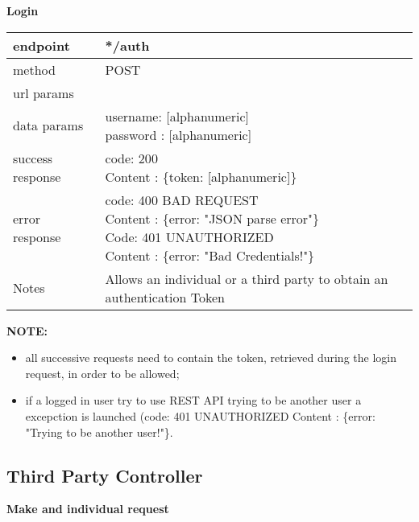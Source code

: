\textbf{Login}\\

	\begin{tabularx}{\linewidth}{| l| l }
		\hline
		endpoint & */auth\\
		\hline
		method & POST \\
		\hline
		url params & \\
		\hline
		data params &
		\parbox{0.7\textwidth}{
			\bigskip
			username: [alphanumeric]\\
			password : [alphanumeric]
			\bigskip
		} \\
		\hline
		success response &
		\parbox{0.7\textwidth}{
			\bigskip
			code: 200\\
			Content : \{token: [alphanumeric]\}
			\bigskip
		} \\
		\hline
		error response &
		\parbox{0.7\textwidth}{
			\bigskip
			code: 400 BAD REQUEST \\
			Content : \{error: "JSON parse error"\}\\
			Code: 401 UNAUTHORIZED \\
			Content : \{error: "Bad Credentials!"\}
			\bigskip
		} \\
		\hline
		Notes & 
		\parbox{0.7\textwidth}{
			\bigskip Allows an individual or a third party to obtain an authentication Token
		\bigskip }\\
		\hline
	\end{tabularx}
\newpage

\textbf{NOTE: }
\begin{itemize}
\item all successive requests need to contain the token, retrieved during the login request, in order to be allowed;
\item if a logged in user try to use REST API trying to be another user a excepction is launched (code: 401 UNAUTHORIZED Content : \{error: "Trying to be another user!"\}.
\end{itemize}

\subsection{Third Party Controller}

\textbf{Make and individual request} \\


